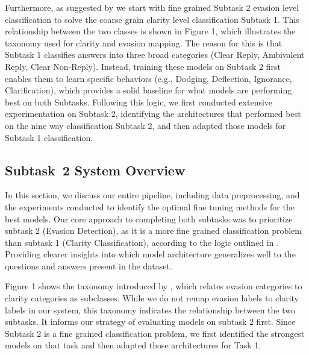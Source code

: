 \documentclass[11pt]{article}
\begin{document}
Furthermore, as suggested by \citet{thomas2024isaidthatdataset} we start with fine grained Subtask 2 evasion level classification to solve the coarse grain clarity level classification Subtask 1. This relationship between the two classes is shown in Figure 1, which illustrates the taxonomy used for clarity and evasion mapping. The reason for this is that Subtask 1 classifies answers into three broad categories (Clear Reply, Ambivalent Reply, Clear Non-Reply).  Instead, training these models on Subtask 2 first enables them to learn specific behaviors (e.g., Dodging, Deflection, Ignorance, Clarification), which provides a solid baseline for what models are performing best on both Subtasks. Following this logic, we first conducted extensive experimentation on Subtask 2, identifying the architectures that performed best on the nine way classification Subtask 2, and then adapted those models for Subtask 1 classification.

\subsection{Subtask~2 System Overview}
In this section, we discuss our entire pipeline, including data preprocessing, and the experiments conducted to identify the optimal fine tuning methods for the best models. Our core approach to completing both subtasks was to prioritize subtask 2 (Evasion Detection), as it is a more fine grained classification problem than subtask 1 (Clarity Classification), according to the logic outlined in \citet{thomas2024isaidthatdataset}. Providing clearer insights into which model architecture generalizes well to the questions and answers present in the dataset.

Figure 1 shows the taxonomy introduced by \citet{thomas2024isaidthatdataset}, which relates evasion categories to clarity categories as subclasses. While we do not remap evasion labels to clarity labels in our system, this taxonomy indicates the relationship between the two subtasks. It informs our strategy of evaluating models on subtask 2 first. Since Subtask 2 is a fine grained classification problem, we first identified the strongest models on that task and then adapted those architectures for Task 1.
\end{document}
